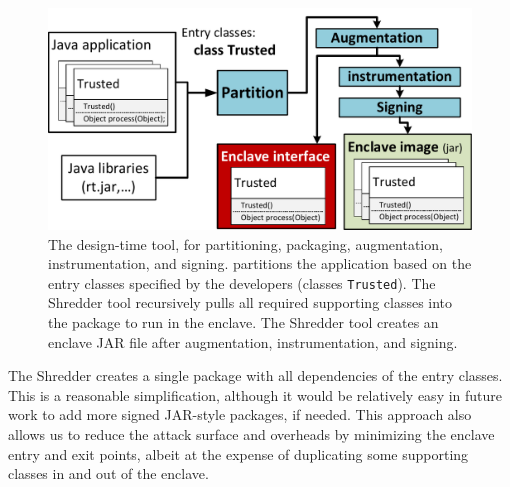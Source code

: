 \begin{figure}[t!]
\centering
\includegraphics[width=4.5in]{civet/figures/building-tool.pdf}
\caption[\sysname{}: overview of the design-time tool.]
{The \sysname{} design-time tool, for partitioning, packaging, augmentation, instrumentation, and signing.
\sysname{} partitions the \java{} application based on the entry classes
specified by the developers (classes {\tt Trusted}).
The Shredder tool recursively pulls all required supporting classes into the 
package to run in the enclave.
The Shredder tool creates an enclave JAR file after augmentation,
instrumentation, and signing.}
\label{fig:builder}
\end{figure}

The Shredder creates a single package with all dependencies of the
entry classes.
This is a reasonable simplification, although 
it would be relatively easy in future work to add more signed JAR-style packages,
if needed.
This approach also allows us to 
reduce the attack surface and overheads by minimizing the 
enclave entry and exit points, albeit at the expense of duplicating some supporting
classes in and out of the enclave.




